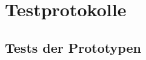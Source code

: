 \documentclass{scrartcl}
\begin{document}

\section{Testprotokolle}
\subsection{Tests der Prototypen}
\end{document}
